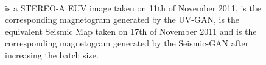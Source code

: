\documentclass[11pt,a4paper,onecolumn]{report}
\begin{document}
\begin{figure}[t]%
  \centering
  \\
  \caption[]{ is a STEREO-A EUV image taken on 11th of
  November 2011,
   is the corresponding magnetogram generated by
  the UV-GAN,  is the equivalent Seismic Map taken
  on 17th of November 2011 and
   is the corresponding magnetogram generated by the
  Seismic-GAN after increasing the batch size.}
  \label{fig:batch}
\end{figure}
\end{document}
